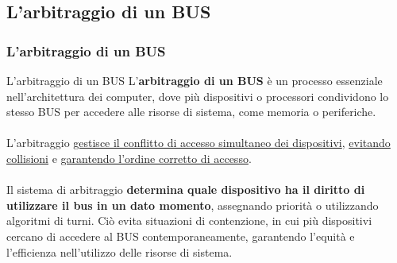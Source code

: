 %	
%		
%	





\subsection[L'arbitraggio di un BUS]{L'arbitraggio di un BUS}
\begin{frame}
	\frametitle{L'arbitraggio di un BUS}
	  
	\begin{block}{L'arbitraggio di un BUS}
		L'\textbf{arbitraggio di un BUS} è un processo essenziale nell'architettura dei computer, dove più dispositivi o processori condividono lo stesso BUS per accedere alle risorse di sistema, come memoria o periferiche.\\~\\
		
		L'arbitraggio \underline{gestisce il conflitto di accesso simultaneo dei dispositivi}, \underline{evitando collisioni} e \underline{garantendo l'ordine corretto di accesso}.\\~\\

		Il sistema di arbitraggio \textbf{determina quale dispositivo ha il diritto di utilizzare il bus in un dato momento}, assegnando priorità o utilizzando algoritmi di turni. Ciò evita situazioni di contenzione, in cui più dispositivi cercano di accedere al BUS contemporaneamente, garantendo l'equità e l'efficienza nell'utilizzo delle risorse di sistema.
		
	\end{block}
\end{frame}


